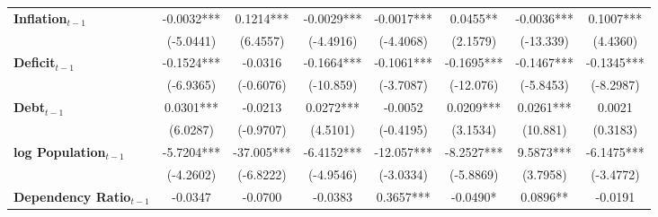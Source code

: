 \begin{center}
\begin{tabular}{lccccccc}
\textbf{Inflation$_{t-1}$}      &      -0.0032***      &          0.1214***          &          -0.0029***          &              -0.0017***             &             0.0455**             &          -0.0036***         &           0.1007***            \\
\textbf{ }                         &      (-5.0441)       &           (6.4557)          &          (-4.4916)           &              (-4.4068)              &             (2.1579)             &          (-13.339)          &            (4.4360)            \\
\textbf{Deficit$_{t-1}$}             &      -0.1524***      &           -0.0316           &          -0.1664***          &              -0.1061***             &            -0.1695***            &          -0.1467***         &           -0.1345***           \\
\textbf{ }                         &      (-6.9365)       &          (-0.6076)          &          (-10.859)           &              (-3.7087)              &            (-12.076)             &          (-5.8453)          &           (-8.2987)            \\
\textbf{Debt$_{t-1}$}                &      0.0301***       &           -0.0213           &          0.0272***           &               -0.0052               &            0.0209***             &          0.0261***          &             0.0021             \\
\textbf{ }                         &       (6.0287)       &          (-0.9707)          &           (4.5101)           &              (-0.4195)              &             (3.1534)             &           (10.881)          &            (0.3183)            \\
\textbf{log Population$_{t-1}$}      &      -5.7204***      &          -37.005***         &          -6.4152***          &              -12.057***             &            -8.2527***            &          9.5873***          &           -6.1475***           \\
\textbf{ }                         &      (-4.2602)       &          (-6.8222)          &          (-4.9546)           &              (-3.0334)              &            (-5.8869)             &           (3.7958)          &           (-3.4772)            \\
\textbf{Dependency Ratio$_{t-1}$}   &       -0.0347        &           -0.0700           &           -0.0383            &              0.3657***              &             -0.0490*             &           0.0896**          &            -0.0191             \\

\end{tabular}
\end{center}

